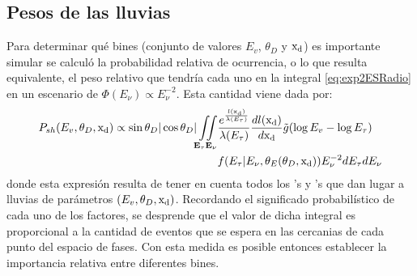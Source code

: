 	\subsection{Pesos de las lluvias}
	Para determinar qu\'e bines (conjunto de valores $E_v$, $\theta_D$ y ${\rm x_d}$) es importante simular se calcul\'o la probabilidad relativa de ocurrencia, o lo que resulta equivalente, el peso relativo que tendr\'ia cada uno en la integral \ref{eq:exp2ESRadio} en un escenario de $\Phi(E_\nu)\propto E_\nu^{-2}$.
	Esta cantidad viene dada por:
	\begin{equation}
		\begin{aligned}
			P_{sh}(E_v,\theta_D,{\rm x_d})
			\propto
			\sin{\theta_D}|\cos{\theta_D}|
			\iint\limits_{\mathbf{E_\tau}\mathbf{E_\nu}}&
			\frac{e^{\frac{l({\rm x_d})}{\lambda(E_\tau)}}}{\lambda(E_\tau)}\frac{dl({\rm x_d})}{d{\rm x_d}}
			\tilde{g}(\log E_v-\log E_\tau)\\
			&f(E_\tau|E_\nu,\theta_E(\theta_D,{\rm x_d}))
			E_\nu^{-2}
			dE_\tau dE_\nu
		\end{aligned}
		\label{eq:weightsRadio}
	\end{equation}
	donde esta expresi\'on resulta de tener en cuenta todos los \nutau{}'s y \tauon{}'s que dan lugar a lluvias de par\'ametros $(E_v,\theta_D,{\rm x_d})$.
	Recordando el significado probabil\'istico de cada uno de los factores, se desprende que el valor de dicha integral es proporcional a la cantidad de eventos que se espera en las cercanias de cada punto del espacio de fases.
	Con esta medida es posible entonces establecer la importancia relativa entre diferentes bines.
	
